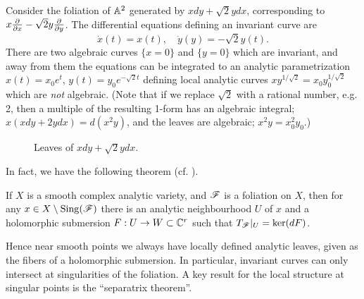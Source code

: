 \begin{example}\label{ex:irrational}
    Consider the foliation of $\mathbb{A}^2$ generated by $xdy+\sqrt2ydx$, corresponding
    to $x\pdv{}{x}-\sqrt2y\pdv{}{y}$. The differential equations defining an
    invariant curve are
    \begin{equation*}
        \dot x(t) = x(t), \quad \dot y(y)=-\sqrt2y(t).
    \end{equation*}
    There are two algebraic curves $\{x=0\}$ and $\{y=0\}$ which are invariant,
    and away from them the equations can be integrated to an analytic
    parametrization $x(t)=x_0e^t$, $y(t)=y_0e^{-\sqrt2t}$ defining local
    analytic curves $xy^{1/\sqrt2}=x_0y_0^{1/\sqrt2}$ which are \emph{not}
    algebraic. (Note that if we replace $\sqrt2$ with a rational number, e.g. 2,
    then a multiple of the resulting 1-form has an algebraic integral;
    $x(xdy+2ydx)=d(x^2y)$, and the leaves are algebraic; $x^2y=x_0^2y_0$.)
    \begin{figure}[H]
        \centering
        \caption{Leaves of $xdy+\sqrt{2}ydx$.}
        \label{fig:irrational}
    \end{figure}
\end{example}

In fact, we have the following theorem (cf. \cite[Thm 2.20]{voisin_book}).

\begin{theorem}[Frobenius]\label{thm:frobenius}
    If $X$ is a smooth complex analytic variety, and $\mathscr{F}$ is a foliation on
    $X$, then for any $x\in X\setminus\operatorname{Sing}(\mathscr{F})$ there is an analytic
    neighbourhood $U$ of $x$ and a holomorphic submersion $F:U\to W\subset\mathbb{C}^r$
    such that $T_{\mathscr{F}}|_U=\ker(dF)$.
\end{theorem}

Hence near smooth points we always have locally defined analytic leaves, given
as the fibers of a holomorphic submersion. In particular, invariant curves can
only intersect at singularities of the foliation. A key result for the local
structure at singular points is the ``separatrix theorem''.

